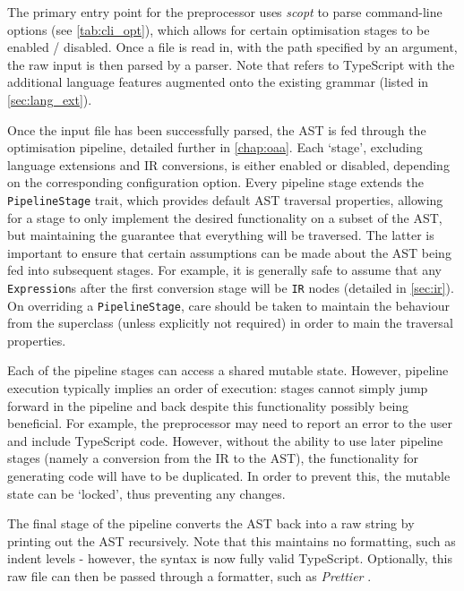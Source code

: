 The primary entry point for the preprocessor uses \textit{scopt} \cite{scopt} to parse command-line options (see \autoref{tab:cli_opt}), which allows for certain optimisation stages to be enabled / disabled.
Once a file is read in, with the path specified by an argument, the raw input is then parsed by a \tsext parser.
Note that \tsext refers to TypeScript with the additional language features augmented onto the existing grammar (listed in \autoref{sec:lang_ext}).

Once the input file has been successfully parsed, the AST is fed through the optimisation pipeline, detailed further in \autoref{chap:oaa}.
Each `stage', excluding language extensions and IR conversions, is either enabled or disabled, depending on the corresponding configuration option.
Every pipeline stage extends the \texttt{PipelineStage} trait, which provides default AST traversal properties, allowing for a stage to only implement the desired functionality on a subset of the AST, but maintaining the guarantee that everything will be traversed.
The latter is important to ensure that certain assumptions can be made about the AST being fed into subsequent stages.
For example, it is generally safe to assume that any \texttt{Expression}s after the first conversion stage will be \texttt{IR} nodes (detailed in \autoref{sec:ir}).
On overriding a \texttt{PipelineStage}, care should be taken to maintain the behaviour from the superclass (unless explicitly not required) in order to main the traversal properties.

Each of the pipeline stages can access a shared mutable state.
However, pipeline execution typically implies an order of execution: stages cannot simply jump forward in the pipeline and back despite this functionality possibly being beneficial.
For example, the preprocessor may need to report an error to the user and include TypeScript code.
However, without the ability to use later pipeline stages (namely a conversion from the IR to the AST), the functionality for generating code will have to be duplicated.
In order to prevent this, the mutable state can be `locked', thus preventing any changes.

The final stage of the pipeline converts the AST back into a raw string by printing out the AST recursively.
Note that this maintains no formatting, such as indent levels - however, the syntax is now fully valid TypeScript.
Optionally, this raw file can then be passed through a formatter, such as \textit{Prettier} \cite{prettier}.
